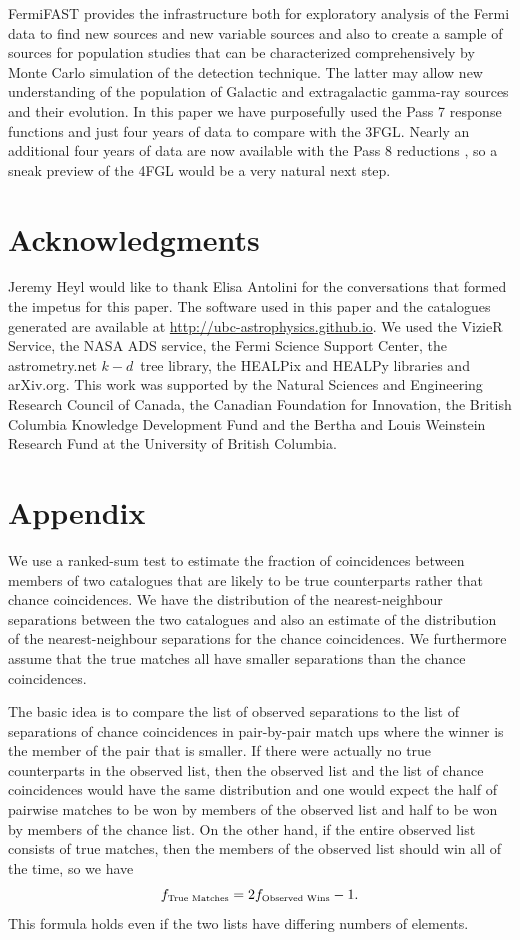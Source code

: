 \documentclass[useAMS,usenatbib]{mn2e}
\begin{document}
FermiFAST provides the infrastructure both for exploratory analysis of
the Fermi data to find new sources and new variable sources and also
to create a sample of sources for population studies that can be
characterized comprehensively by Monte Carlo simulation of the
detection technique.  The latter may allow new understanding of the
population of Galactic and extragalactic gamma-ray sources and their
evolution. In this paper we have purposefully used the Pass 7 response
functions and just four years of data to compare with the 3FGL.
Nearly an additional four years of data are now available with the
Pass 8 reductions \citep{2013arXiv1303.3514A}, so a sneak preview of
the 4FGL would be a very natural next step.

\section*{Acknowledgments}

Jeremy Heyl would like to thank Elisa Antolini for the conversations
that formed the impetus for this paper.  The software used in this
paper and the catalogues generated are available at
\url{http://ubc-astrophysics.github.io}.  We used the VizieR Service,
the NASA ADS service, the Fermi Science Support Center, the
astrometry.net $k-d$~tree library, the HEALPix and HEALPy libraries
and arXiv.org. This work was supported by the Natural Sciences and
Engineering Research Council of Canada, the Canadian Foundation for
Innovation, the British Columbia Knowledge Development Fund and the
Bertha and Louis Weinstein Research Fund at the University of British
Columbia.




\section*{Appendix}

We use a ranked-sum test to estimate the fraction of coincidences
between members of two catalogues that are likely to be true
counterparts rather that chance coincidences.  We have the
distribution of the nearest-neighbour separations between the two
catalogues and also an estimate of the distribution of the
nearest-neighbour separations for the chance coincidences.  We
furthermore assume that the true matches all have smaller separations
than the chance coincidences.

The basic idea is to compare the list of observed separations to the
list of separations of chance coincidences in pair-by-pair match ups
where the winner is the member of the pair that is smaller.  If there
were actually no true counterparts in the observed list, then the
observed list and the list of chance coincidences would have the same
distribution and one would expect the half of pairwise matches to be
won by members of the observed list and half to be won by members of
the chance list.  On the other hand, if the entire observed list
consists of true matches, then the members of the observed list should
win all of the time, so we have
$$
f_\textrm{\scriptsize True Matches} = 2 f_\textrm{\scriptsize Observed Wins} - 1.
$$
This formula holds even if the two lists have differing numbers of
elements.
\end{document}
